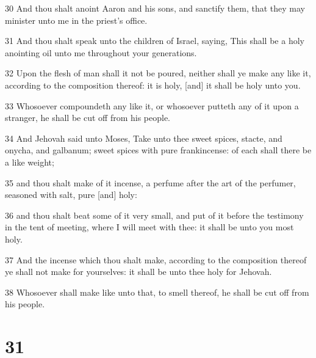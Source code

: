 \par 30 And thou shalt anoint Aaron and his sons, and sanctify them, that they may minister unto me in the priest's office.
\par 31 And thou shalt speak unto the children of Israel, saying, This shall be a holy anointing oil unto me throughout your generations.
\par 32 Upon the flesh of man shall it not be poured, neither shall ye make any like it, according to the composition thereof: it is holy, [and] it shall be holy unto you.
\par 33 Whosoever compoundeth any like it, or whosoever putteth any of it upon a stranger, he shall be cut off from his people.
\par 34 And Jehovah said unto Moses, Take unto thee sweet spices, stacte, and onycha, and galbanum; sweet spices with pure frankincense: of each shall there be a like weight;
\par 35 and thou shalt make of it incense, a perfume after the art of the perfumer, seasoned with salt, pure [and] holy:
\par 36 and thou shalt beat some of it very small, and put of it before the testimony in the tent of meeting, where I will meet with thee: it shall be unto you most holy.
\par 37 And the incense which thou shalt make, according to the composition thereof ye shall not make for yourselves: it shall be unto thee holy for Jehovah.
\par 38 Whosoever shall make like unto that, to smell thereof, he shall be cut off from his people.

\chapter{31}

